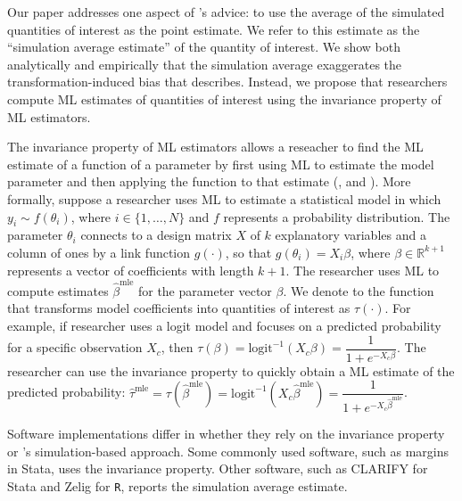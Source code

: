 \documentclass[11pt]{article}
\begin{document}
Our paper addresses one aspect of \cite{KingTomzWittenberg2000}'s advice: to use the average of the simulated quantities of interest as the point estimate.
We refer to this estimate as the ``simulation average estimate'' of the quantity of interest.
We show both analytically and empirically that the simulation average exaggerates the transformation-induced bias that \cite{Rainey2017} describes.
Instead, we propose that researchers compute ML estimates of quantities of interest using the invariance property of ML estimators.

The invariance property of ML estimators allows a reseacher to find the ML estimate of a function of a parameter by first using ML to estimate the model parameter and then applying the function to that estimate (\citealt[pp. 75--76]{King1989}, and \citealt[pp. 320--321]{CasellaBerger2002}).
More formally, suppose a researcher uses ML to estimate a statistical model in which $y_i {\sim} f(\theta_i)$, where $i \in \{1,\ldots, N\}$ and $f$ represents a probability distribution.
The parameter $\theta_i$ connects to a design matrix $X$ of $k$ explanatory variables and a column of ones by a link function $g(\cdot)$, so that $g(\theta_i) = X_i\beta$, where $\beta \in \mathbb{R}^{k+1}$ represents a vector of coefficients with length $k + 1$.
The researcher uses ML to compute estimates $\hat{\beta}^{\text{mle}}$ for the parameter vector $\beta$.
We denote to the function that transforms model coefficients into quantities of interest as $\tau(\cdot)$.
For example, if researcher uses a logit model and focuses on a predicted probability for a specific observation $X_c$, then $\tau(\beta) = \text{logit}^{-1}( X_c \beta) = \dfrac{1}{1 + e^{-X_c\beta}}$.
The researcher can use the invariance property to quickly obtain a ML estimate of the predicted probability: $\hat{\tau}^{\text{mle}} = \tau \left( \hat{\beta}^{\text{mle}}\right) = \text{logit}^{-1} \left( X_c \hat{\beta}^{\text{mle}} \right) = \dfrac{1}{1 + e^{-X_c \hat{\beta}^{\text{mle}}}}$.

Software implementations differ in whether they rely on the invariance property or \cite{KingTomzWittenberg2000}'s simulation-based approach.
Some commonly used software, such as margins in Stata, uses the invariance property.
Other software, such as CLARIFY for Stata and Zelig for \texttt{R}, reports the simulation average estimate.
\end{document}
